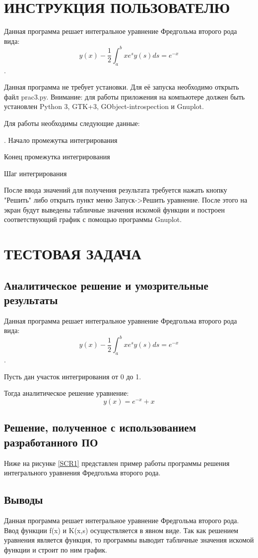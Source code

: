 \section{ИНСТРУКЦИЯ ПОЛЬЗОВАТЕЛЮ}
Данная программа решает интегральное уравнение Фредгольма второго рода вида: 
$$
y(x)-{\frac{1}{2}}\int_a^b xe^s y(s) ds = e^{-x}
$$ .

Данная программа не требует установки. Для её запуска необходимо открыть файл prac3.py. Внимание: для работы приложения на компьютере должен быть установлен Python 3, GTK+3, GObject-introspection  и Gnuplot.

Для работы необходимы следующие данные:

.	Начало промежутка интегрирования 

	Конец промежутка интегрирования 

	Шаг интегрирования 

После ввода значений для получения результата требуется нажать кнопку "Решить" либо открыть пункт меню  Запуск->Решить уравнение. После этого на экран будут выведены табличные значения искомой функции и построен соответствующий график с помощью программы Gnuplot.

\section{ТЕСТОВАЯ ЗАДАЧА}
\subsection{Аналитическое решение и умозрительные результаты}
Данная программа решает интегральное уравнение Фредгольма второго рода вида: 
$$
y(x)-{\frac{1}{2}}\int_a^b xe^s y(s) ds = e^{-x}
$$ .

Пусть дан участок интегрирования от 0 до 1.

Тогда аналитическое решение уравнение:
$$
y(x)=e^{-x}+x
$$

\subsection{Решение, полученное с использованием разработанного ПО}
Ниже на рисунке \ref{SCR1} представлен пример работы программы решения интегрального уравнения Фредгольма второго рода.
\subsection{Выводы}
Данная программа решает интегральное уравнение Фредгольма второго рода. Ввод функции f(x) и K(x,s)  осуществляется в явном виде. Так как решением уравнения является функция, то программы выводит  табличные значения искомой функции и строит по ним график.

